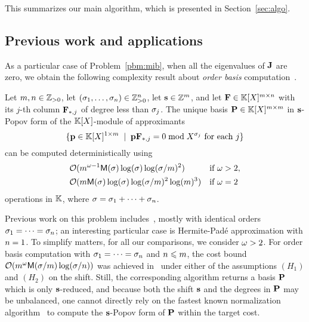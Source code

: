 \documentclass[preprint]{sig-alternate-05-2015}
\begin{document}
This summarizes our main algorithm, which is presented in
Section~\ref{sec:algo}.

\subsection{Previous work and applications}
\label{subsec:applications}

As a particular case of Problem~\ref{pbm:mib}, when all the eigenvalues of
$\mulmat$ are zero, we obtain the following complexity result about \emph{order
basis} computation~\cite[Definition~2.2]{ZhoLab12}.

\begin{thm}
  \label{thm:order_basis}
  Let $m,n \in \mathbb{Z}_{> 0}$, let $(\sigma_1,\ldots,\sigma_n) \in
  \mathbb{Z}_{> 0}^n$, let $\mathbf{s} \in \mathbb{Z}^{m}$, and let $\mat{F} \in
  \polMatSpace[\rdim][\cdim]$
  with its $j$-th column $\matcol{\mat{F}}{j}$ of
  degree less than $\sigma_j$. The unique basis $\intBasis \in \intSpace$ in
  $\mathbf{s}$-Popov form of the $\mathbb{K}[X]$-module of approximants
  \[ \{ \row{p} \in \polMatSpace[1][\rdim] \;\mid\;
    \row{p} \matcol{\mat{F}}{j} = 0 \bmod X^{\order_j} \text{ for each } j \}
  \] can be computed deterministically
  using
  \begin{align*}
  \mathcal{O}( & m^{\omega-1} \mathsf{M}(\sigma)
  \log(\sigma) \log(\sigma/m)^2 ) & \text{if }
  \omega>2, \\
  \mathcal{O}( & m \mathsf{M}(\sigma) \log(\sigma)
  \log(\sigma/m)^2 \log(m)^3 
  ) & \text{if } \omega=2\;
  \end{align*}
  operations in $\mathbb{K}$, where $\sigma = \sigma_1 + \cdots + \sigma_n$.
\end{thm}

Previous work on this problem
includes~\cite{BecLab94,GiJeVi03,Storjohann06,ZhoLab12,JeNeScVi15}, mostly with
identical orders $\sigma_1 = \cdots = \sigma_n$; an interesting particular
case is Hermite-Pad\'e approximation with $n=1$. To simplify matters, for
all our comparisons, we consider $\omega>2$. For order basis computation
with $\sigma_1 = \cdots = \sigma_n$ and $n \leqslant m$, the cost bound
$\mathcal{O}( m^{\omega} \mathsf{M}(\sigma/m) \log(\sigma/n) )$ was
achieved in~\cite{ZhoLab12} under either of the assumptions $(H_1)$ and $(H_2)$
on the shift. Still, the corresponding algorithm returns a basis $\intBasis$
which is only $\mathbf{s}$-reduced, and because both the shift $\mathbf{s}$ and the
degrees in $\intBasis$ may be unbalanced, one cannot directly rely on the
fastest known normalization algorithm~\cite{SarSto11} to compute the
$\mathbf{s}$-Popov form of $\intBasis$ within the target cost.
\end{document}
